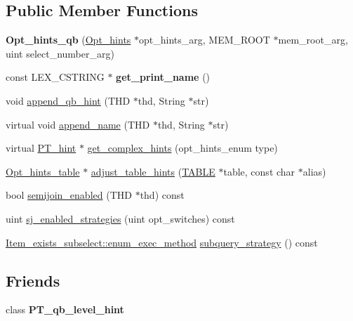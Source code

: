 \subsection*{Public Member Functions}
\begin{DoxyCompactItemize}
\item 
\mbox{\label{classOpt__hints__qb_a4b3dab91f797de06312a1e502c4f0317}} 
{\bfseries Opt\+\_\+hints\+\_\+qb} (\mbox{\hyperlink{classOpt__hints}{Opt\+\_\+hints}} $\ast$opt\+\_\+hints\+\_\+arg, M\+E\+M\+\_\+\+R\+O\+OT $\ast$mem\+\_\+root\+\_\+arg, uint select\+\_\+number\+\_\+arg)
\item 
\mbox{\label{classOpt__hints__qb_adc8b4150bf4fe519313ba6e491ab9015}} 
const L\+E\+X\+\_\+\+C\+S\+T\+R\+I\+NG $\ast$ {\bfseries get\+\_\+print\+\_\+name} ()
\item 
void \mbox{\hyperlink{classOpt__hints__qb_a8399caf3fc8957c96122049e1343dfa2}{append\+\_\+qb\+\_\+hint}} (T\+HD $\ast$thd, String $\ast$str)
\item 
virtual void \mbox{\hyperlink{classOpt__hints__qb_af4f0b581f86642fce87816546656efb7}{append\+\_\+name}} (T\+HD $\ast$thd, String $\ast$str)
\item 
virtual \mbox{\hyperlink{classPT__hint}{P\+T\+\_\+hint}} $\ast$ \mbox{\hyperlink{classOpt__hints__qb_a6312e36d56b68d1c8622482d39dc580b}{get\+\_\+complex\+\_\+hints}} (opt\+\_\+hints\+\_\+enum type)
\item 
\mbox{\hyperlink{classOpt__hints__table}{Opt\+\_\+hints\+\_\+table}} $\ast$ \mbox{\hyperlink{classOpt__hints__qb_a393fe013d9b0ddea680a3321bc139851}{adjust\+\_\+table\+\_\+hints}} (\mbox{\hyperlink{structTABLE}{T\+A\+B\+LE}} $\ast$table, const char $\ast$alias)
\item 
bool \mbox{\hyperlink{classOpt__hints__qb_a4412c93a6800caf9848c00aca470ffc0}{semijoin\+\_\+enabled}} (T\+HD $\ast$thd) const
\item 
uint \mbox{\hyperlink{classOpt__hints__qb_a566ed5ba6a0666c607639f27d0d04cce}{sj\+\_\+enabled\+\_\+strategies}} (uint opt\+\_\+switches) const
\item 
\mbox{\hyperlink{classItem__exists__subselect_aa110ca13dba0d9c620f5f72e6bad798e}{Item\+\_\+exists\+\_\+subselect\+::enum\+\_\+exec\+\_\+method}} \mbox{\hyperlink{classOpt__hints__qb_a32ec634d8d4f0bc5fe08b46fd28e1772}{subquery\+\_\+strategy}} () const
\end{DoxyCompactItemize}
\subsection*{Friends}
\begin{DoxyCompactItemize}
\item 
\mbox{\label{classOpt__hints__qb_a7976d18a535a68e3109dd6b9618d9c7c}} 
class {\bfseries P\+T\+\_\+qb\+\_\+level\+\_\+hint}
\end{DoxyCompactItemize}

